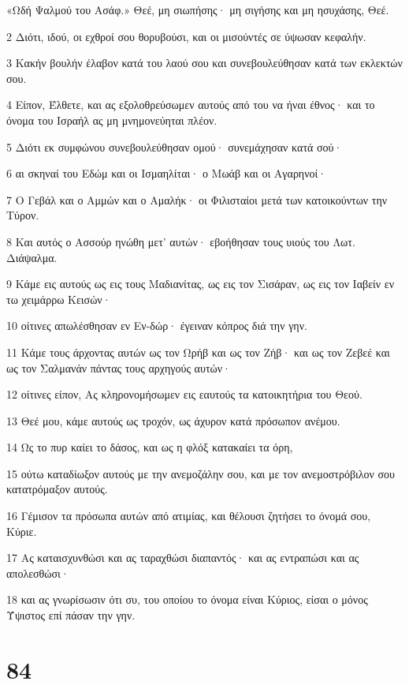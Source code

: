 \par «Ωδή Ψαλμού του Ασάφ.» Θεέ, μη σιωπήσης· μη σιγήσης και μη ησυχάσης, Θεέ.
\par 2 Διότι, ιδού, οι εχθροί σου θορυβούσι, και οι μισούντές σε ύψωσαν κεφαλήν.
\par 3 Κακήν βουλήν έλαβον κατά του λαού σου και συνεβουλεύθησαν κατά των εκλεκτών σου.
\par 4 Είπον, Έλθετε, και ας εξολοθρεύσωμεν αυτούς από του να ήναι έθνος· και το όνομα του Ισραήλ ας μη μνημονεύηται πλέον.
\par 5 Διότι εκ συμφώνου συνεβουλεύθησαν ομού· συνεμάχησαν κατά σού·
\par 6 αι σκηναί του Εδώμ και οι Ισμαηλίται· ο Μωάβ και οι Αγαρηνοί·
\par 7 Ο Γεβάλ και ο Αμμών και ο Αμαλήκ· οι Φιλισταίοι μετά των κατοικούντων την Τύρον.
\par 8 Και αυτός ο Ασσούρ ηνώθη μετ' αυτών· εβοήθησαν τους υιούς του Λωτ. Διάψαλμα.
\par 9 Κάμε εις αυτούς ως εις τους Μαδιανίτας, ως εις τον Σισάραν, ως εις τον Ιαβείν εν τω χειμάρρω Κεισών·
\par 10 οίτινες απωλέσθησαν εν Εν-δώρ· έγειναν κόπρος διά την γην.
\par 11 Κάμε τους άρχοντας αυτών ως τον Ωρήβ και ως τον Ζήβ· και ως τον Ζεβεέ και ως τον Σαλμανάν πάντας τους αρχηγούς αυτών·
\par 12 οίτινες είπον, Ας κληρονομήσωμεν εις εαυτούς τα κατοικητήρια του Θεού.
\par 13 Θεέ μου, κάμε αυτούς ως τροχόν, ως άχυρον κατά πρόσωπον ανέμου.
\par 14 Ως το πυρ καίει το δάσος, και ως η φλόξ κατακαίει τα όρη,
\par 15 ούτω καταδίωξον αυτούς με την ανεμοζάλην σου, και με τον ανεμοστρόβιλον σου κατατρόμαξον αυτούς.
\par 16 Γέμισον τα πρόσωπα αυτών από ατιμίας, και θέλουσι ζητήσει το όνομά σου, Κύριε.
\par 17 Ας καταισχυνθώσι και ας ταραχθώσι διαπαντός· και ας εντραπώσι και ας απολεσθώσι·
\par 18 και ας γνωρίσωσιν ότι συ, του οποίου το όνομα είναι Κύριος, είσαι ο μόνος Ύψιστος επί πάσαν την γην.

\chapter{84}

